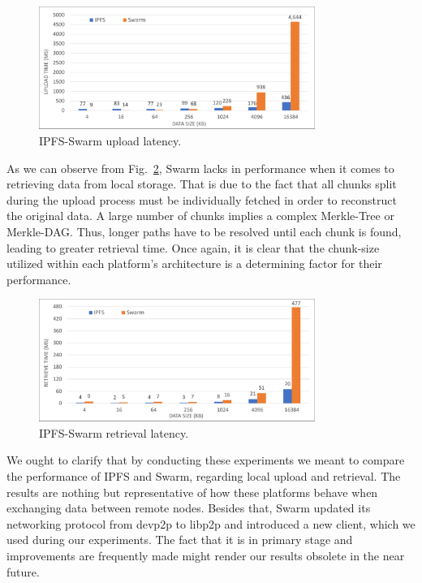 \begin{figure}[htbp]
\centerline{\includegraphics[width=9cm]{figs/ipfs_swarm_upload.pdf}}
\caption{IPFS-Swarm upload latency.}
\label{fig: ipfs_swarm_upload}
\end{figure}
\setlength{\belowcaptionskip}{-10pt}

As we can observe from Fig.~\ref{fig: ipfs_swarm_retrieve}, Swarm lacks in performance when it comes to retrieving data from local storage. That is due to the fact that all chunks split during the upload process must be individually fetched in order to reconstruct the original data. A large number of chunks implies a complex Merkle-Tree or Merkle-DAG. Thus, longer paths have to be resolved until each chunk is found, leading to greater retrieval time. Once again, it is clear that the chunk-size utilized within each platform’s architecture is a determining factor for their performance.

\begin{figure}[htbp]
\centerline{\includegraphics[width=9cm]{figs/ipfs_swarm_retrieve.pdf}}
\caption{IPFS-Swarm retrieval latency.}
\label{fig: ipfs_swarm_retrieve}
\end{figure}
\setlength{\belowcaptionskip}{-10pt}

We ought to clarify that by conducting these experiments we meant to compare the performance of IPFS and Swarm, regarding local upload and retrieval. The results are nothing but representative of how these platforms behave when exchanging data between remote nodes. Besides that, Swarm updated its networking protocol from devp2p to libp2p and introduced a new client, which we used during our experiments. The fact that it is in primary stage and improvements are frequently made might render our results obsolete in the near future.

